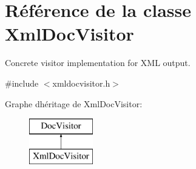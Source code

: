 \hypertarget{class_xml_doc_visitor}{}\section{Référence de la classe Xml\+Doc\+Visitor}
\label{class_xml_doc_visitor}


Concrete visitor implementation for X\+M\+L output.  




{\ttfamily \#include $<$xmldocvisitor.\+h$>$}

Graphe d\textquotesingle{}héritage de Xml\+Doc\+Visitor\+:\begin{figure}[H]
\begin{center}
\leavevmode
\includegraphics[height=2.000000cm]{class_xml_doc_visitor}
\end{center}
\end{figure}
